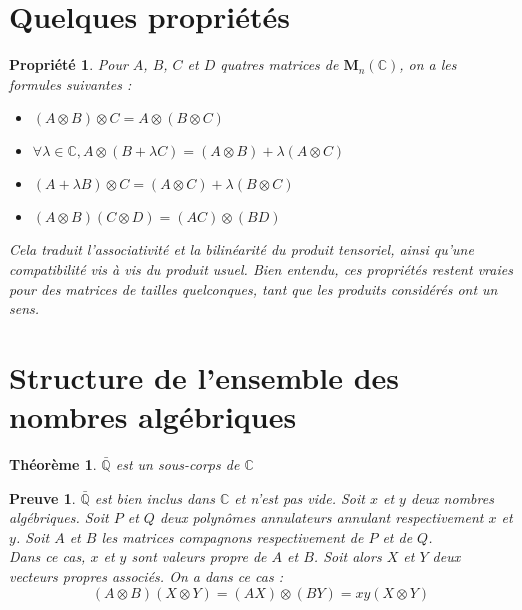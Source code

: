 \documentclass[10pt,a4paper]{article}
\newtheorem{prop}{Propriété}[section]
\newtheorem*{dem}{Preuve}
\newtheorem{thm}{Théorème}[section]
\begin{document}
\section{Quelques propriétés}
\begin{prop}
	Pour $A$, $B$, $C$ et $D$ quatres matrices de $\mathbf{M}_n(\mathbb{C})$, on a les formules suivantes :
	\begin{itemize}
		\item $(A \otimes B)\otimes C = A \otimes (B \otimes C)$
		\item $\forall \lambda \in \mathbb{C}, A \otimes (B + \lambda C)=(A \otimes B) + \lambda (A \otimes C)$
		\item $(A + \lambda B) \otimes C = (A \otimes C) + \lambda (B \otimes C)$
		\item $(A \otimes B)(C \otimes D)=(AC)\otimes (BD)$
	\end{itemize}

	Cela traduit l'associativité et la bilinéarité du produit tensoriel, ainsi qu'une compatibilité vis à vis du produit usuel. Bien entendu, ces propriétés restent vraies pour des matrices de tailles quelconques, tant que les produits considérés ont un sens. 
\end{prop}

\section{Structure de l'ensemble des nombres algébriques}

\begin{thm}
$\bar{\mathbb{Q}}$ est un sous-corps de $\mathbb{C}$
\end{thm}

\begin{dem}
$\bar{\mathbb{Q}}$ est bien inclus dans $\mathbb{C}$ et n'est pas vide. Soit $x$ et $y$ deux nombres algébriques. Soit $P$ et $Q$ deux polynômes annulateurs annulant respectivement $x$ et $y$. Soit $A$ et $B$ les matrices compagnons respectivement de $P$ et de $Q$.
\\
Dans ce cas, $x$ et $y$ sont valeurs propre de $A$ et $B$. Soit alors $X$ et $Y$ deux vecteurs propres associés. On a dans ce cas : $$(A \otimes B)(X \otimes Y)=(AX)\otimes (BY)=xy(X \otimes Y)$$ 
\end{dem}



	
\end{document}

